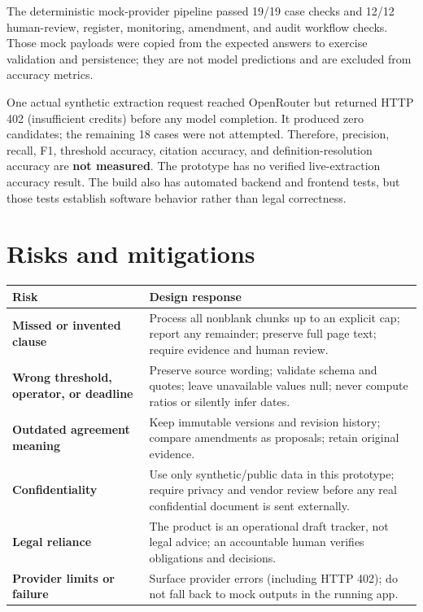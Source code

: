 \documentclass[10pt]{article}
\begin{document}
The deterministic mock-provider pipeline passed 19/19 case checks and 12/12 human-review, register, monitoring, amendment, and audit workflow checks. Those mock payloads were copied from the expected answers to exercise validation and persistence; they are not model predictions and are excluded from accuracy metrics.

One actual synthetic extraction request reached OpenRouter but returned HTTP 402 (insufficient credits) before any model completion. It produced zero candidates; the remaining 18 cases were not attempted. Therefore, precision, recall, F1, threshold accuracy, citation accuracy, and definition-resolution accuracy are \textbf{not measured}. The prototype has no verified live-extraction accuracy result. The build also has automated backend and frontend tests, but those tests establish software behavior rather than legal correctness.

\section{Risks and mitigations}
\begin{tabularx}{\linewidth}{@{}>{\bfseries}p{1.28in}X@{}}
\toprule
Risk & Design response\\
\midrule
Missed or invented clause & Process all nonblank chunks up to an explicit cap; report any remainder; preserve full page text; require evidence and human review.\\
Wrong threshold, operator, or deadline & Preserve source wording; validate schema and quotes; leave unavailable values null; never compute ratios or silently infer dates.\\
Outdated agreement meaning & Keep immutable versions and revision history; compare amendments as proposals; retain original evidence.\\
Confidentiality & Use only synthetic/public data in this prototype; require privacy and vendor review before any real confidential document is sent externally.\\
Legal reliance & The product is an operational draft tracker, not legal advice; an accountable human verifies obligations and decisions.\\
Provider limits or failure & Surface provider errors (including HTTP 402); do not fall back to mock outputs in the running app.\\
\bottomrule
\end{tabularx}
\end{document}

